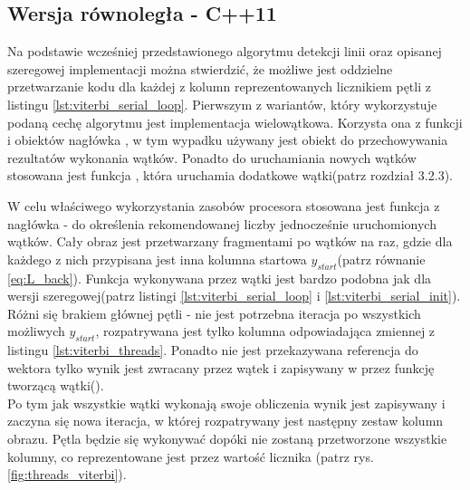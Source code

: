 \documentclass[document.tex]{subfiles}
\begin{document}
\subsection{Wersja równoległa - C++11}
\indent Na podstawie wcześniej przedstawionego algorytmu detekcji linii oraz opisanej szeregowej implementacji można stwierdzić, że możliwe jest oddzielne przetwarzanie kodu dla każdej z kolumn reprezentowanych licznikiem
 pętli z listingu \ref{lst:viterbi_serial_loop}. Pierwszym z wariantów, który wykorzystuje 
podaną cechę algorytmu jest implementacja wielowątkowa. Korzysta ona z funkcji i obiektów nagłówka , w tym wypadku używany jest obiekt  do przechowywania rezultatów wykonania
wątków. Ponadto do uruchamiania nowych wątków stosowana jest funkcja , która uruchamia dodatkowe wątki(patrz rozdział 3.2.3).
 

\indent W celu właściwego wykorzystania zasobów procesora stosowana jest funkcja z nagłówka  -  do określenia rekomendowanej liczby jednocześnie uruchomionych wątków.
Cały obraz jest przetwarzany fragmentami po  wątków na raz, gdzie dla każdego z nich przypisana jest inna kolumna startowa $y_{start}$(patrz równanie \ref{eq:L_back}). 
Funkcja wykonywana przez wątki jest bardzo podobna jak dla wersji szeregowej(patrz listingi \ref{lst:viterbi_serial_loop} i \ref{lst:viterbi_serial_init}). Różni się brakiem głównej pętli - nie jest potrzebna iteracja po wszystkich możliwych $y_{start}$, rozpatrywana jest tylko kolumna odpowiadająca zmiennej  z listingu \ref{lst:viterbi_threads}.
Ponadto nie jest przekazywana referencja do wektora  tylko wynik jest zwracany przez wątek i zapisywany w  przez funkcję tworzącą wątki(). 
\\
\indent Po tym jak wszystkie wątki wykonają swoje obliczenia wynik jest zapisywany i zaczyna się nowa iteracja, w której rozpatrywany jest następny zestaw kolumn obrazu. Pętla będzie się wykonywać dopóki nie zostaną przetworzone wszystkie kolumny, co reprezentowane jest przez wartość licznika (patrz rys.\ref{fig:threads_viterbi}).
\end{document}

